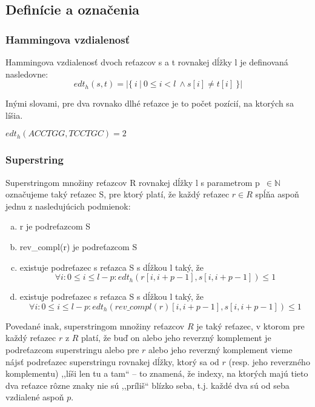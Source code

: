 \subsection{Definície a označenia}

\subsubsection{Hammingova vzdialenosť}
\begin{defn}
Hammingova vzdialenosť dvoch reťazcov s a t rovnakej dĺžky l je definovaná nasledovne:
$$
edt_h(s, t) = \left\vert{ \{~i~|~0 \leq i < l~\land s[i] \neq t[i] ~\} }\right\vert
$$
\end{defn}

Inými slovami, pre dva rovnako dlhé reťazce je to počet pozícií, na ktorých sa líšia.

\begin{example}
$edt_h(ACCTGG, TCCTGC) = 2$ 
\end{example}

\subsubsection{Superstring}
\begin{defn}
Superstringom množiny reťazcov R rovnakej dĺžky l s parametrom p~$\in \mathbb{N}$ označujeme taký reťazec S, pre ktorý platí, že každý reťazec $r \in R$ spĺňa aspoň jednu z nasledujúcich podmienok:
    \begin{enumerate}[(a)]
    \item r je podreťazcom S
    \item rev\_compl(r) je podreťazcom S
    \item existuje podreťazec s reťazca S s dĺžkou l taký, že 
    $$
    \forall i : 0 \leq i \leq l - p : edt_h(r[i, i+p-1], s[i, i+p-1]) \leq 1
    $$
    \item existuje podreťazec s reťazca S s dĺžkou l taký, že 
    $$
    \forall i : 0 \leq i \leq l - p : edt_h(rev\_compl(r)[i, i+p-1], s[i, i+p-1]) \leq 1
    $$    
    \end{enumerate}
\end{defn}

Povedané inak, superstringom množiny reťazcov $R$ je taký reťazec, v ktorom pre každý reťazec $r$ z $R$ platí, že buď on alebo jeho reverzný komplement je podreťazcom superstringu alebo pre $r$ alebo jeho reverzný komplement vieme nájsť podreťazec superstringu rovnakej dĺžky, ktorý sa od $r$ (resp. jeho reverzného komplementu) ,,líši len tu a tam`` -- to znamená, že indexy, na ktorých majú tieto dva reťazce rôzne znaky nie sú ,,príliš`` blízko seba, t.j. každé dva sú od seba vzdialené aspoň $p$.


